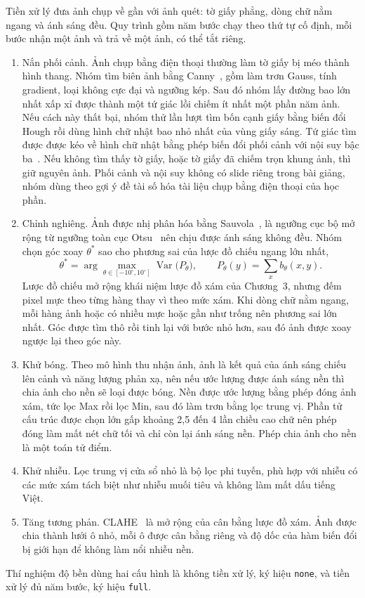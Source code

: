 Tiền xử lý đưa ảnh chụp về gần với ảnh quét: tờ giấy phẳng, dòng chữ nằm ngang và ánh sáng đều.
Quy trình gồm năm bước chạy theo thứ tự cố định, mỗi bước nhận một ảnh và trả về một ảnh, có thể tắt riêng.
\begin{enumerate}[label=\arabic*.]
  \item Nắn phối cảnh. Ảnh chụp bằng điện thoại thường làm tờ giấy bị méo thành hình thang. Nhóm tìm biên ảnh bằng Canny~\cite{canny1986computational}, gồm làm trơn Gauss, tính gradient, loại không cực đại và ngưỡng kép. Sau đó nhóm lấy đường bao lớn nhất xấp xỉ được thành một tứ giác lồi chiếm ít nhất một phần năm ảnh. Nếu cách này thất bại, nhóm thử lần lượt tìm bốn cạnh giấy bằng biến đổi Hough rồi dùng hình chữ nhật bao nhỏ nhất của vùng giấy sáng. Tứ giác tìm được được kéo về hình chữ nhật bằng phép biến đổi phối cảnh với nội suy bậc ba~\cite{gonzalez2018dip}. Nếu không tìm thấy tờ giấy, hoặc tờ giấy đã chiếm trọn khung ảnh, thì giữ nguyên ảnh. Phối cảnh và nội suy không có slide riêng trong bài giảng, nhóm dùng theo gợi ý đề tài số hóa tài liệu chụp bằng điện thoại của học phần.
  \item Chỉnh nghiêng. Ảnh được nhị phân hóa bằng Sauvola~\cite{sauvola2000binarization}, là ngưỡng cục bộ mở rộng từ ngưỡng toàn cục Otsu~\cite{otsu1979threshold} nên chịu được ánh sáng không đều. Nhóm chọn góc xoay $\theta^*$ sao cho phương sai của lược đồ chiếu ngang lớn nhất,
  \begin{equation}\label{eq:deskew}
    \theta^*=\arg\max_{\theta\in[-10^\circ,10^\circ]}\operatorname{Var}\bigl(P_\theta\bigr),\qquad P_\theta(y)=\sum_x b_\theta(x,y).
  \end{equation}
  Lược đồ chiếu mở rộng khái niệm lược đồ xám của Chương~3, nhưng đếm pixel mực theo từng hàng thay vì theo mức xám. Khi dòng chữ nằm ngang, mỗi hàng ảnh hoặc có nhiều mực hoặc gần như trống nên phương sai lớn nhất. Góc được tìm thô rồi tinh lại với bước nhỏ hơn, sau đó ảnh được xoay ngược lại theo góc này.
  \item Khử bóng. Theo mô hình thu nhận ảnh, ảnh là kết quả của ánh sáng chiếu lên cảnh và năng lượng phản xạ, nên nếu ước lượng được ánh sáng nền thì chia ảnh cho nền sẽ loại được bóng. Nền được ước lượng bằng phép đóng ảnh xám, tức lọc Max rồi lọc Min, sau đó làm trơn bằng lọc trung vị. Phần tử cấu trúc được chọn lớn gấp khoảng 2,5 đến 4 lần chiều cao chữ nên phép đóng làm mất nét chữ tối và chỉ còn lại ánh sáng nền. Phép chia ảnh cho nền là một toán tử điểm.
  \item Khử nhiễu. Lọc trung vị cửa sổ nhỏ là bộ lọc phi tuyến, phù hợp với nhiễu có các mức xám tách biệt như nhiễu muối tiêu và không làm mất dấu tiếng Việt.
  \item Tăng tương phản. CLAHE~\cite{zuiderveld1994clahe} là mở rộng của cân bằng lược đồ xám. Ảnh được chia thành lưới ô nhỏ, mỗi ô được cân bằng riêng và độ dốc của hàm biến đổi bị giới hạn để không làm nổi nhiễu nền.
\end{enumerate}
Thí nghiệm độ bền dùng hai cấu hình là không tiền xử lý, ký hiệu \texttt{none}, và tiền xử lý đủ năm bước, ký hiệu \texttt{full}.
